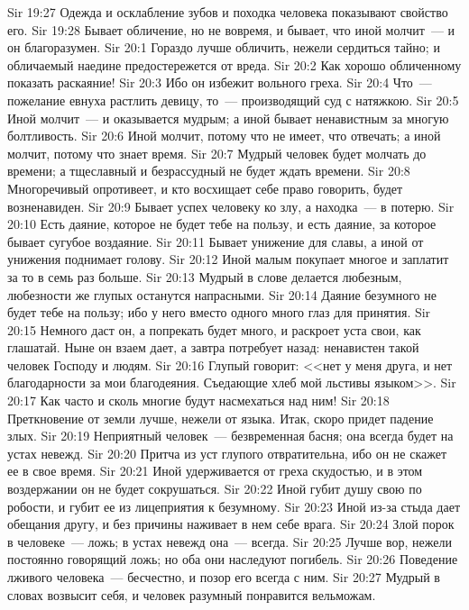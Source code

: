 \vs Sir 19:27 Одежда и осклабление зубов и походка человека показывают свойство его.
\vs Sir 19:28 Бывает обличение, но не вовремя, и бывает, что иной молчит~--- и он благоразумен.
\vs Sir 20:1 Гораздо лучше обличить, нежели сердиться тайно; и обличаемый наедине предостережется от вреда.
\vs Sir 20:2 Как хорошо обличенному показать раскаяние!
\vs Sir 20:3 Ибо он избежит вольного греха.
\vs Sir 20:4 Что~--- пожелание евнуха растлить девицу, то~--- производящий суд с натяжкою.
\vs Sir 20:5 Иной молчит~--- и оказывается мудрым; а иной бывает ненавистным за многую болтливость.
\vs Sir 20:6 Иной молчит, потому что не имеет, что отвечать; а иной молчит, потому что знает время.
\vs Sir 20:7 Мудрый человек будет молчать до времени; а тщеславный и безрассудный не будет ждать времени.
\vs Sir 20:8 Многоречивый опротивеет, и кто восхищает себе право говорить, будет возненавиден.
\vs Sir 20:9 Бывает успех человеку ко злу, а находка~--- в потерю.
\vs Sir 20:10 Есть даяние, которое не будет тебе на пользу, и есть даяние, за которое бывает сугубое воздаяние.
\vs Sir 20:11 Бывает унижение для славы, а иной от унижения поднимает голову.
\vs Sir 20:12 Иной малым покупает многое и заплатит за то в семь раз больше.
\vs Sir 20:13 Мудрый в слове делается любезным, любезности же глупых останутся напрасными.
\vs Sir 20:14 Даяние безумного не будет тебе на пользу; ибо у него вместо одного много глаз для принятия.
\vs Sir 20:15 Немного даст он, а попрекать будет много, и раскроет уста свои, как глашатай. Ныне он взаем дает, а завтра потребует назад: ненавистен такой человек Господу и людям.
\vs Sir 20:16 Глупый говорит: <<нет у меня друга, и нет благодарности за мои благодеяния. Съедающие хлеб мой льстивы языком>>.
\vs Sir 20:17 Как часто и сколь многие будут насмехаться над ним!
\vs Sir 20:18 Преткновение от земли лучше, нежели от языка. Итак, скоро придет падение злых.
\vs Sir 20:19 Неприятный человек~--- безвременная басня; она всегда будет на устах невежд.
\vs Sir 20:20 Притча из уст глупого отвратительна, ибо он не скажет ее в свое время.
\vs Sir 20:21 Иной удерживается от греха скудостью, и в этом воздержании он не будет сокрушаться.
\vs Sir 20:22 Иной губит душу свою по робости, и губит ее из лицеприятия к безумному.
\vs Sir 20:23 Иной из-за стыда дает обещания другу, и без причины наживает в нем себе врага.
\vs Sir 20:24 Злой порок в человеке~--- ложь; в устах невежд она~--- всегда.
\vs Sir 20:25 Лучше вор, нежели постоянно говорящий ложь; но оба они наследуют погибель.
\vs Sir 20:26 Поведение лживого человека~--- бесчестно, и позор его всегда с ним.
\vs Sir 20:27 Мудрый в словах возвысит себя, и человек разумный понравится вельможам.
